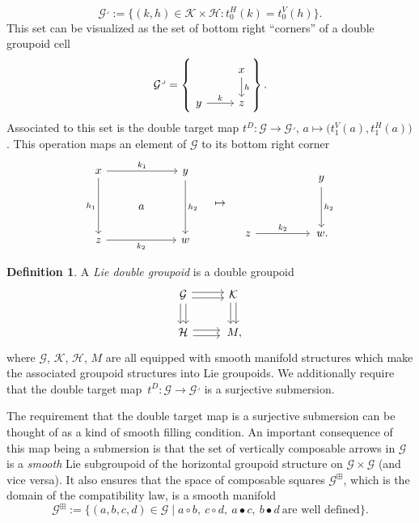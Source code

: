 \documentclass[pdftex]{sigma}
\numberwithin{equation}{section}
\theoremstyle{definition}
\newtheorem{Definition}[Theorem]{Definition}
\newcommand{\CG}{\mathcal{G}}
\newcommand{\CH}{\mathcal{H}}
\newcommand{\CK}{\mathcal{K}}
\newcommand{\darrow}{\arrow[d, shift right] \arrow[d, shift left]}
\newcommand{\rarrow}{\arrow[r, shift right] \arrow[r, shift left]}
\begin{document}
\[ \CG^\lrcorner := \big\{ (k,h) \in \CK \times \CH \colon t_0^H(k) = t_0^V(h) \big\}. \]
This set can be visualized as the set of bottom right ``corners'' of a double groupoid cell
\[
\CG^\lrcorner = \left \{ \begin{tikzcd}
 & x \arrow[d, "h"] \\
y \arrow[r, "k"] & z
\end{tikzcd} \right\}.
\]
Associated to this set is the double target map
$
t^D \colon \CG \to \CG^\lrcorner$, $a \mapsto \big(t_1^V(a), t_1^H(a)\big)$.
This operation maps an element of $ \CG $ to its bottom right corner
\[
\begin{tikzcd}
   x \arrow[rr, "k_1"] \arrow[dd, "h_1", swap] & & y \arrow[dd, "h_2"] \\
   & a & \\
   z\arrow[rr, "k_2", swap] & & w
\end{tikzcd} \quad
\mapsto \quad
\begin{tikzcd}
   & & y \arrow[dd, "h_2"]\\
   & & \\
   z \arrow[rr, "k_2"] & &\, w.
\end{tikzcd}
\]
\begin{Definition}\label{defn:lie.double.groupoid}
A \emph{Lie double groupoid} is a double groupoid
 \[\begin{tikzcd}
\CG \darrow \rarrow & \CK \darrow \\
\CH \rarrow &\, M,
\end{tikzcd}\]
where $ \CG$, $\CK$, $\CH$, $M $ are all equipped with smooth manifold structures which make the associated groupoid structures into Lie groupoids. We additionally require that the double target map~${t^D \colon \CG \to \CG^\lrcorner}$
is a surjective submersion.
\end{Definition}
The requirement that the double target map is a surjective submersion can be thought of as a kind of smooth filling condition.
An important consequence of this map being a submersion is that the set of vertically composable arrows in $ \CG $ is a \emph{smooth} Lie subgroupoid of the horizontal groupoid structure on $ \CG \times \CG $ (and vice versa). It also ensures that the space of composable squares $ \CG^\boxplus $, which is the domain of the compatibility law, is a smooth manifold
\begin{equation}\label{equation:groupoid.box}
\CG^\boxplus := \{ (a,b,c,d) \in \CG \mid a \circ b, \ c \circ d, \ a \bullet c, \ b \bullet d \ \text{are well defined} \}. \end{equation}
\end{document}
